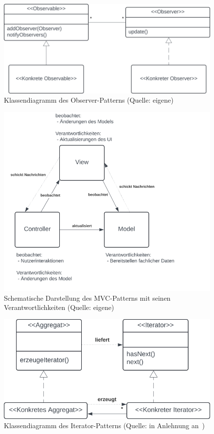     \begin{figure}
        \centering
        \includegraphics[scale=0.4]{part two/Objektorientierter Entwurf/img/observer}
        \caption{Klassendiagramm des Observer-Patterns (Quelle: eigene)}
        \label{fig:observer_cc}
    \end{figure}
    \begin{figure}
        \centering
        \includegraphics[scale=0.4]{part two/Objektorientierter Entwurf/img/mvc}
        \caption{Schematische Darstellung des MVC-Patterns mit seinen Verantwortlichkeiten (Quelle: eigene)}
        \label{fig:mvc_cc}
    \end{figure}
    \begin{figure}
        \centering
        \includegraphics[scale=0.4]{part two/Objektorientierter Entwurf/img/iterator}
        \caption{Klassendiagramm des Iterator-Patterns (Quelle: in Anlehnung an~\cite[60, Abb. 3.9]{Wed09b})}
        \label{fig:iterator_cc}
    \end{figure}
